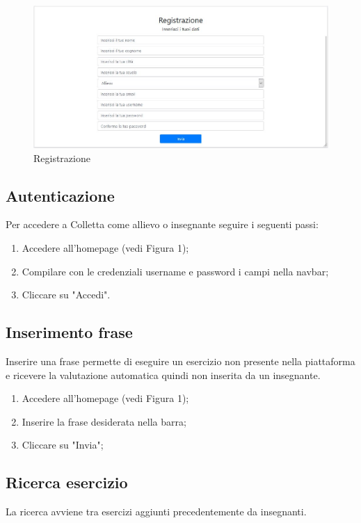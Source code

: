 \documentclass[11pt,a4paper]{article}
\begin{document}
{	\begin{figure}[h]
		\centering
		\includegraphics[scale=0.65]{images/registrazione.jpg}
		\caption{Registrazione}
	\end{figure}
	\newpage

	\subsection{Autenticazione}
	Per accedere a Colletta come allievo o insegnante seguire i seguenti passi:
	\begin{enumerate}
		\item Accedere all'homepage (vedi Figura 1);
		\item Compilare con le credenziali username e password i campi nella navbar;
		\item Cliccare su "Accedi".
	\end{enumerate}

	\subsection{Inserimento frase}
	Inserire una frase permette di eseguire un esercizio non presente nella piattaforma e ricevere la valutazione automatica quindi non inserita da un insegnante.	
	\begin{enumerate}
		\item Accedere all'homepage (vedi Figura 1);
		\item Inserire la frase desiderata nella barra;
		\item Cliccare su "Invia";
	\end{enumerate}

	\newpage
	\subsection{Ricerca esercizio}
	La ricerca avviene tra esercizi aggiunti precedentemente da insegnanti. 
	
}
\end{document}
